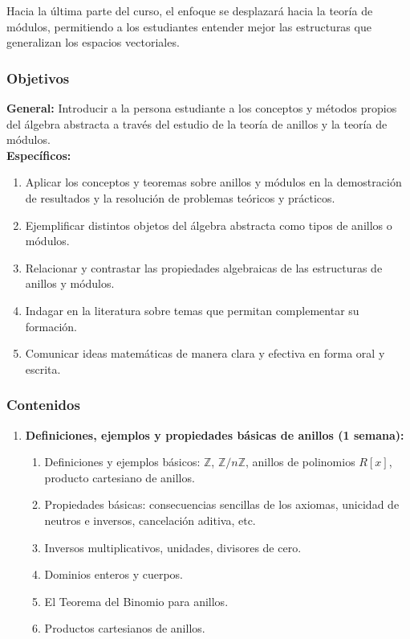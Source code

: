 \begin{refsection}
Hacia la última parte del curso, el enfoque se desplazará hacia la teoría de módulos, permitiendo a los estudiantes entender mejor las estructuras que generalizan los espacios vectoriales.




\subsubsection*{Objetivos}

\textbf{General:} Introducir a la persona estudiante a los conceptos y métodos propios del álgebra abstracta a través del estudio de la teoría de anillos y la teoría de módulos. \\

\textbf{Específicos:}

\begin{enumerate}
\item Aplicar los conceptos y teoremas sobre anillos y módulos en la demostración de resultados y la resolución de problemas teóricos y prácticos.
\item Ejemplificar distintos objetos del álgebra abstracta como tipos de anillos o módulos.
\item Relacionar y contrastar las propiedades algebraicas de las estructuras de anillos y módulos.
\item Indagar en la literatura sobre temas que permitan complementar su formación.
\item Comunicar ideas matemáticas de manera clara y efectiva en forma oral y escrita.
\end{enumerate}

\subsubsection*{Contenidos}

\begin{enumerate}
\item \textbf{Definiciones, ejemplos y propiedades básicas de anillos (1 semana):} 
\begin{enumerate}
    \item Definiciones y ejemplos básicos: $\mathbb{Z}$, $\mathbb{Z}/n\mathbb{Z}$, anillos de polinomios $R[x]$, producto cartesiano de anillos.
    \item Propiedades básicas: consecuencias sencillas de los axiomas, unicidad de neutros e inversos, cancelación aditiva, etc.
    \item Inversos multiplicativos, unidades, divisores de cero.
    \item Dominios enteros y cuerpos.
    \item El Teorema del Binomio para anillos.
    \item Productos cartesianos de anillos.
\end{enumerate}


\end{enumerate}
\end{refsection}
